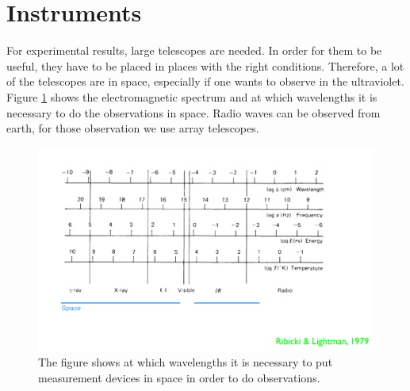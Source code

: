 \section{Instruments}
For experimental results, large telescopes are needed. In order for them to be useful, they have to be placed in places with the right conditions. Therefore, a lot of the telescopes are in space, especially if one wants to observe in the ultraviolet. Figure \ref{fig:electromagneticspectrum} shows the electromagnetic spectrum and at which wavelengths it is necessary to do the observations in space. Radio waves can be observed from earth, for those observation we use array telescopes. 
\begin{figure}[H]
	\centering
		\includegraphics[width=1.0\textwidth]{img/ch-01/electromagneticspectrum.png}
		\caption{The figure shows at which wavelengths it is necessary to put measurement devices in space in order to do observations.}
		\label{fig:electromagneticspectrum}
\end{figure}

